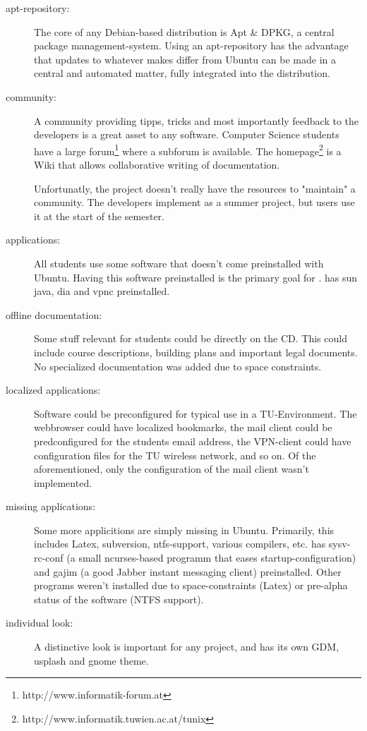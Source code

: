 \begin{description}
  \item[apt-repository:] The core of any Debian-based distribution is Apt \& DPKG,
    a central package management-system. Using an apt-repository has the
    advantage that updates to whatever makes \tunix differ from Ubuntu can be
    made in a central and automated matter, fully integrated into the
    distribution.
  \item[community:] A community providing tipps, tricks and most importantly
    feedback to the developers is a great asset to any software. Computer
    Science students have a large forum\footnote{http://www.informatik-forum.at}
    where a \tunix subforum is available. The \tunix
    homepage\footnote{http://www.informatik.tuwien.ac.at/tunix} is a Wiki that
    allows collaborative writing of documentation. 

    Unfortunatly, the \tunix project doesn't really have the resources to
    "maintain" a community. The developers implement \tunix as a summer project,
    but users use it at the start of the semester. 
  \item[applications:] All students use some software that doesn't come
    preinstalled with Ubuntu. Having this software preinstalled is the
    primary goal for \tunix. \tunix has sun java, dia and vpnc
    preinstalled.
  \item[offline documentation:] Some stuff relevant for students could be
    directly on the CD. This could include course descriptions, building
    plans and important legal
    documents. No specialized documentation was added due to space
    constraints.
  \item[localized applications:] Software could be preconfigured for typical
    use in a TU-Environment. The webbrowser could have localized bookmarks,
    the mail client could be predconfigured for the students email address,
    the VPN-client could have configuration files for the TU wireless
    network, and so on. Of the aforementioned, only the configuration of
    the mail client wasn't implemented.
  \item[missing applications:] Some more applicitions are simply missing in
    Ubuntu. Primarily, this includes Latex, subversion, ntfs-support,
    various compilers, etc. \tunix has sysv-rc-conf (a small ncurses-based
    programm that eases startup-configuration) and gajim (a good Jabber
    instant messaging client) preinstalled. Other programs weren't
    installed due to space-constraints (Latex) or pre-alpha status of the
    software (NTFS support).
  \item[individual look:] A distinctive look is important for any project,
    and \tunix has its own GDM, usplash and gnome theme.
\end{description}
